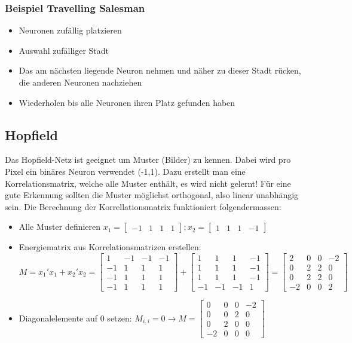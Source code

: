 \subsubsection{Beispiel Travelling Salesman}
\begin{itemize}
	\item Neuronen zufällig platzieren
	\item Auswahl zufälliger Stadt
	\item Das am nächsten liegende Neuron nehmen und näher zu dieser Stadt rücken, die anderen Neuronen nachziehen
	\item Wiederholen bis alle Neuronen ihren Platz gefunden haben
\end{itemize}

\subsection{Hopfield}
Das Hopfield-Netz ist geeignet um Muster (Bilder) zu kennen. Dabei wird pro
Pixel ein binäres Neuron verwendet (-1,1).  Dazu erstellt man eine
Korrelationsmatrix, welche alle Muster enthält, es wird nicht gelernt!  Für eine
gute Erkennung sollten die Muster möglichst orthogonal, also linear unabhängig
sein.  Die Berechnung der Korrellationsmatrix funktioniert folgendermassen:

\begin{itemize}
	\item Alle Muster definieren $x_1 = \begin{bmatrix}-1&1&1&1 \end{bmatrix};
			x_2 = \begin{bmatrix}1&1&1&-1\end{bmatrix}$
	\item Energiematrix aus Korrelationsmatrizen erstellen: $M = x_1' x_1 + x_2'
		x_2 =
		\begin{bmatrix}
			 1&-1&-1&-1 \\
			-1& 1& 1& 1 \\
			-1& 1& 1& 1 \\
			-1& 1& 1& 1
		\end{bmatrix} +
		\begin{bmatrix}
			 1& 1& 1&-1\\
			 1& 1& 1&-1\\
			 1& 1& 1&-1\\
			-1&-1&-1& 1
		\end{bmatrix} =
		\begin{bmatrix}
			 2&0&0&-2\\
			 0&2&2& 0\\
			 0&2&2& 0\\
			-2&0&0& 2
		\end{bmatrix}$
	\item Diagonalelemente auf 0 setzen: $M_{i,i} = 0 \rightarrow
		M=\begin{bmatrix}
			 0&0&0&-2\\
			 0&0&2& 0\\
			 0&2&0& 0\\
			-2&0&0& 0
		\end{bmatrix}$
\end{itemize}
